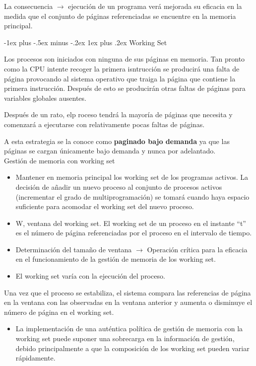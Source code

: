 \documentclass[10pt,portrait, twocolumn]{article}
\makeatletter
\renewcommand{\subsubsection}{\@startsection{subsubsection}{3}{0mm}%
                                {-1ex plus -.5ex minus -.2ex}%
                                {1ex plus .2ex}%
                                {\normalfont\small\bfseries}}
\makeatother
\begin{document}
La consecuencia $\rightarrow$ ejecución de un programa verá mejorada su eficacia en la medida que el conjunto de páginas referenciadas se encuentre en la memoria principal.

\subsubsection{Working Set}

Los procesos son iniciados con ninguna de sus páginas en memoria. Tan pronto como la CPU intente recoger la primera isntrucción se producirá una falta de página provocando al sistema operativo que traiga la página que contiene la primera instrucción. Después de esto se producirán otras faltas de páginas para variables globales ausentes.

	\quad Después de un rato, elp roceso tendrá la mayoría de páginas que necesita y comenzará a ejecutarse con relativamente pocas faltas de páginas. 
	
	\quad A esta estrategia se la conoce como \textbf{paginado bajo demanda} ya que las páginas se cargan únicamente bajo demanda y nunca por adelantado.\\

Gestión de memoria con working set
	
	\begin{itemize}
	\item Mantener en memoria principal los working set de los programas activos. La decisión de añadir un nuevo proceso al conjunto de procesos activos (incrementar el grado de multiprogramación) se tomará cuando haya espacio suficiente para acomodar el working set del nuevo proceso.
	\item W, ventana del working set. El working set de un proceso en el instante ``t'' es el número de página referenciadas por el proceso en el intervalo de tiempo.
	\item Determinación del tamaño de ventana $\rightarrow$ Operación crítica para la eficacia en el funcionamiento de la gestión de memoria de los working set.
	\item El working set varía con la ejecución del proceso.
	\end{itemize}
	
Una vez que el proceso se estabiliza, el sistema compara las referencias de página en la ventana con las observadas en la ventana anterior y aumenta o disminuye el número de página en el working set.

	\begin{itemize}
	\item La implementación de una auténtica política de gestión de memoria con la working set puede suponer una sobrecarga en la información de gestión, debido principalmente a que la composición de los working set pueden variar rápidamente.
	\end{itemize}
\end{document}
